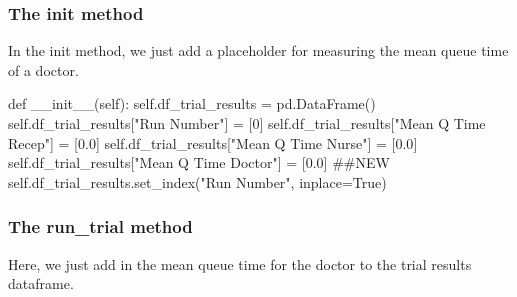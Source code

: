 \documentclass[
  letterpaper,
  DIV=11,
  numbers=noendperiod]{scrreprt}
\newenvironment{Shaded}{\begin{snugshade}}{\end{snugshade}}
\newcommand{\CommentTok}[1]{\textcolor[rgb]{0.37,0.37,0.37}{#1}}
\newcommand{\DecValTok}[1]{\textcolor[rgb]{0.68,0.00,0.00}{#1}}
\newcommand{\FloatTok}[1]{\textcolor[rgb]{0.68,0.00,0.00}{#1}}
\newcommand{\FunctionTok}[1]{\textcolor[rgb]{0.28,0.35,0.67}{#1}}
\newcommand{\KeywordTok}[1]{\textcolor[rgb]{0.00,0.23,0.31}{#1}}
\newcommand{\NormalTok}[1]{\textcolor[rgb]{0.00,0.23,0.31}{#1}}
\newcommand{\OperatorTok}[1]{\textcolor[rgb]{0.37,0.37,0.37}{#1}}
\newcommand{\StringTok}[1]{\textcolor[rgb]{0.13,0.47,0.30}{#1}}
\newcommand{\VariableTok}[1]{\textcolor[rgb]{0.07,0.07,0.07}{#1}}
\begin{document}
\subsubsection{\texorpdfstring{The \textbf{init}
method}{The init method}}\label{the-init-method-1}

In the init method, we just add a placeholder for measuring the mean
queue time of a doctor.

\begin{Shaded}
\begin{Highlighting}[]
\KeywordTok{def}  \FunctionTok{\_\_init\_\_}\NormalTok{(}\VariableTok{self}\NormalTok{):}
    \VariableTok{self}\NormalTok{.df\_trial\_results }\OperatorTok{=}\NormalTok{ pd.DataFrame()}
    \VariableTok{self}\NormalTok{.df\_trial\_results[}\StringTok{"Run Number"}\NormalTok{] }\OperatorTok{=}\NormalTok{ [}\DecValTok{0}\NormalTok{]}
    \VariableTok{self}\NormalTok{.df\_trial\_results[}\StringTok{"Mean Q Time Recep"}\NormalTok{] }\OperatorTok{=}\NormalTok{ [}\FloatTok{0.0}\NormalTok{]}
    \VariableTok{self}\NormalTok{.df\_trial\_results[}\StringTok{"Mean Q Time Nurse"}\NormalTok{] }\OperatorTok{=}\NormalTok{ [}\FloatTok{0.0}\NormalTok{]}
    \VariableTok{self}\NormalTok{.df\_trial\_results[}\StringTok{"Mean Q Time Doctor"}\NormalTok{] }\OperatorTok{=}\NormalTok{ [}\FloatTok{0.0}\NormalTok{] }\CommentTok{\#\#NEW}
    \VariableTok{self}\NormalTok{.df\_trial\_results.set\_index(}\StringTok{"Run Number"}\NormalTok{, inplace}\OperatorTok{=}\VariableTok{True}\NormalTok{)}
\end{Highlighting}
\end{Shaded}

\subsubsection{The run\_trial method}\label{the-run_trial-method}

Here, we just add in the mean queue time for the doctor to the trial
results dataframe.
\end{document}
